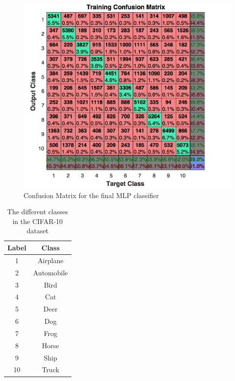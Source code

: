 \begin{figure}[h!]
   \centering
   \includegraphics[width=\textwidth]{images/Confusion_Matrix}
   \caption{Confusion Matrix for the final MLP classifier }
   \label{fig:Conf_Matrix}
\end{figure}

\begin{table}[h]
\begin{center}
 \begin{tabular}{||c | c||}
 \hline
 Label & Class \\ [0.5ex]
 \hline
 1& Airplane\\
 2& Automobile \\
 3& Bird\\
 4& Cat\\
 5& Deer\\
 6& Dog\\
 7& Frog\\
 8& Horse\\
 9& Ship\\
 10& Truck\\[1ex]
 \hline

\end{tabular}
\caption{The different classes in the CIFAR-10 dataset}
\label{Tab:Classes}
\end{center}
\end{table}
